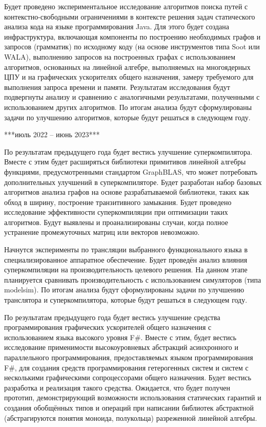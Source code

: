\documentclass[12pt]{article}  %
\theoremstyle{remark}
\begin{document}
Будет проведено экспериментальное исследование алгоритмов поиска путей с контекстно-свободными ограничениями в контексте решения задач статического анализа кода на языке программирования Java. Для этого будет создана инфраструктура, включающая компоненты по построению необходимых графов и запросов (грамматик) по исходному коду (на основе инструментов типа Soot или WALA), выполнению запросов на построенных графах с использованием алгоритмов, основанных на линейной алгебре, выполняемых на многоядерных ЦПУ и на графических ускорителях общего назначения, замеру требуемого для выполнения запроса времени и памяти. Результатам исследования будут подвергнуты анализу и сравнению с аналогичными результатами, полученными с использованием других алгоритмов. По итогам анализа будут сформулированы задачи по улучшению алгоритмов, которые будут решаться в следующем году.


***июль 2022 -- июнь 2023***

По результатам предыдущего года будет вестись улучшение суперкомпилятора. Вместе с этим будет расширяться библиотеки примитивов линейной алгебры функциями, предусмотренными стандартом GraphBLAS, что может потребовать дополнительных улучшений в суперкомпиляторе. Будет разработан набор базовых алгоритмов анализа графов на основе разрабатываемой библиотеки, таких как обход в ширину, построение транзитивного замыкания. Будет проведено исследование эффективности суперкомпиляции при оптимизации таких алгоритмов. Будут выявлены и проанализированы случаи, когда полное устранение промежуточных матриц или векторов невозможно.

Начнутся эксперименты по трансляции выбранного функционального языка в специализированное аппаратное обеспечение. Будет проведён анализ влияния суперкомпиляции на производительность целевого решения. На данном этапе планируется сравнивать производительность с использованием симуляторов (типа modelsim). По итогам анализа будут сформулированы задачи по улучшению транслятора и суперкомпилятора, которые будут решаться в следующем году. 

По результатам предыдущего года будет вестись улучшение средства программирования графических ускорителей общего назначения с использованием языка высокого уровня F#. Вместе с этим, будет вестись исследование применимости высокоуровневых абстракций асинхронного и параллельного программирования, предоставляемых языком программирования F#, для создания средств программирования гетерогенных систем и систем с несколькими графическими сопроцессорами общего назначения. Будет вестись разработка и реализация такого средства. Ожидается, что будет получен прототип, демонстрирующий возможности использования статических гарантий и создания обобщённых типов и операций при написании библиотек абстрактной (абстрагируются понятия моноида, полукольца) разреженной линейной алгебры.
\end{document}
